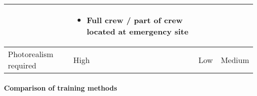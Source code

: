 \begin{table}[h]
\begin{tabular}{@{}p{2.3cm}|p{3.4cm}|p{3.4cm}|p{3.4cm}|@{}}
& \vspace{-2mm} \begin{itemize}[nosep,leftmargin=*,topsep=0pt,partopsep=0pt,align=left,itemsep=0cm]
\renewcommand{\labelitemi}{\tiny\listsymb} 
\item Full crew / part of crew located at emergency site
\end{itemize} \vspace{-\baselineskip} \\
\hline
Photorealism required & High & Low & Medium \\
\bottomrule
\end{tabular}
\end{table}


\paragraph{Comparison of training methods}

